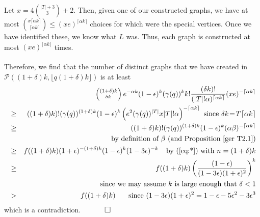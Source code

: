 \documentclass{article}
\newtheorem{Proof of Theorem}{Proof of Theorem}
\begin{document}
Let $x=4\left( ^{|T|+3} _{\phantom{qw}3} \right) + 2$.
Then, given one of our constructed graphs, we have at most
$\left( ^{x \lceil \alpha k \rceil}_{\phantom{i}\lceil \alpha k \rceil} \right) \leq (xe)^{\lceil \alpha k \rceil}$
choices for which were the special vertices.
Once we have identified these, we know what $L$ was.
Thus, each graph is constructed at most $(xe)^{\lceil \alpha k \rceil}$ times. \\
\\

Therefore, 
we find that
the number of distinct graphs that we have created in
$\mathcal{P}((1+\delta)k, \lfloor q(1+\delta)k \rfloor)$
is at least 
\begin{eqnarray*}
& & \left( ^{(1+\delta)k}_{\phantom{qq} \delta k} \right) e^{- \alpha k} (1 - \epsilon)^{k} (\gamma(q))^{k} k! 
\frac{(\delta k)!}{(|T|! \alpha)^{\lceil \alpha k \rceil}} (xe)^{- \lceil \alpha k \rceil} \\
& \geq & ((1+\delta)k)! (\gamma(q))^{(1+\delta)k} (1-\epsilon)^{k} 
\left( e^{2} (\gamma(q))^{|T|}x|T|! \alpha \right) ^{- \lceil \alpha k \rceil} 
\textrm{ since } \delta k \!=\! T \lceil \alpha k \rceil \\
& \geq & ((1+\delta)k)! (\gamma(q))^{(1+\delta)k} (1-\epsilon)^{k} 
(\alpha \beta)^{- \lceil \alpha k \rceil} \\
& &
\textrm{by definition of } \beta \textrm{ (and Proposition~\ref{ger T2.1})} \\
& \geq & f((1+\delta)k) (1+\epsilon)^{-(1+\delta)k} (1-\epsilon)^{k} (1-3\epsilon)^{-k}
\phantom{w} \textrm{ by } (\ref{eq:*}) \textrm{ with } n=(1+\delta)k \\
& \geq & f((1+\delta)k)  \left( \frac{(1-\epsilon)}{(1-3\epsilon)(1+\epsilon)^{2}} \right) ^{k} \\
& & \textrm{since we may assume $k$ is large enough that } \delta<1 \\
& > & f((1+\delta)k) 
\phantom{ww} \textrm{ since } (1-3\epsilon)(1+\epsilon)^{2}=1-\epsilon -5\epsilon^{2} - 3\epsilon^{3}
\end{eqnarray*}
which is a contradiction.
$\phantom{qwerty}
\setlength{\unitlength}{.25cm}
\begin{picture}(1,1)
\put(0,0){\line(1,0){1}}
\put(0,0){\line(0,1){1}}
\put(1,1){\line(-1,0){1}}
\put(1,1){\line(0,-1){1}}
\end{picture}$
\begin{displaymath}
\end{displaymath} 

\phantom{p}
\end{document}
